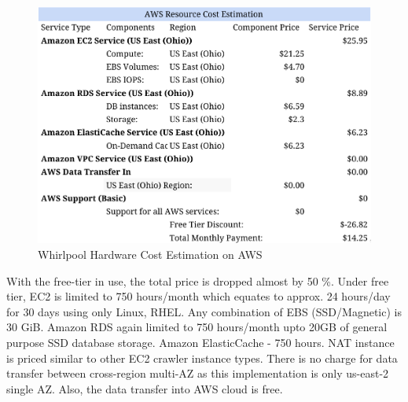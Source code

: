 \begin{figure}[h!]
  \centering
  \includegraphics[width=12cm,height=8cm,keepaspectratio]{../media/crawler/aws-resource-cost-estimation.png}
  \caption{Whirlpool Hardware Cost Estimation on AWS}
  \label{fig:awscost}
\end{figure}

\noindent
With the free-tier in use, the total price is dropped almost by 50 \%. Under free tier, EC2 is limited to 750 hours/month which equates to approx. 24 hours/day for 30 days using only Linux, RHEL. Any combination of EBS (SSD/Magnetic) is 30 GiB. Amazon RDS again limited to 750 hours/month upto 20GB of general purpose SSD database
storage. Amazon ElasticCache - 750 hours. NAT instance is priced similar to other EC2 crawler instance types. There is no charge for data transfer between cross-region multi-AZ as this implementation is only us-east-2 single AZ. Also, the data transfer into AWS cloud is free.

\pagebreak